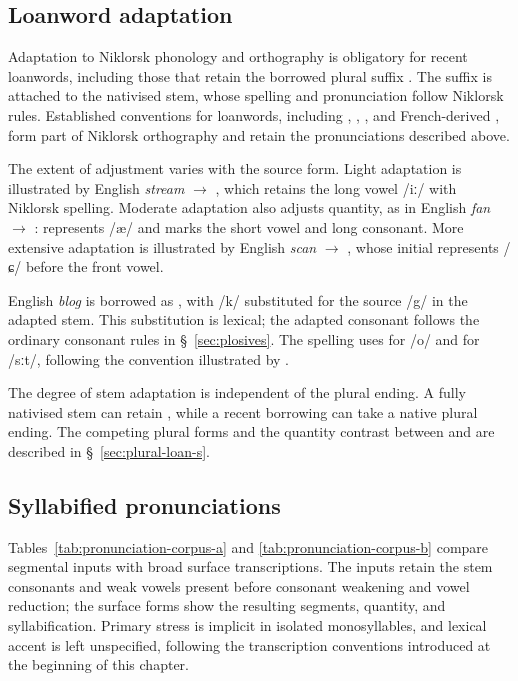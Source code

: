 \subsection{Loanword adaptation}
\label{sec:loanword-adaptation}

Adaptation to Niklorsk phonology and orthography is obligatory for recent loanwords, including those that retain the borrowed plural suffix . The suffix is attached to the nativised stem, whose spelling and pronunciation follow Niklorsk rules. Established conventions for loanwords, including , , , and French-derived , form part of Niklorsk orthography and retain the pronunciations described above.

The extent of adjustment varies with the source form. Light adaptation is illustrated by English \emph{stream} $\rightarrow$ , which retains the long vowel /iː/ with Niklorsk spelling. Moderate adaptation also adjusts quantity, as in English \emph{fan} $\rightarrow$ :  represents /æ/ and  marks the short vowel and long consonant. More extensive adaptation is illustrated by English \emph{scan} $\rightarrow$ , whose initial  represents /ɕ/ before the front vowel.

English \emph{blog} is borrowed as , with /k/ substituted for the source /g/ in the adapted stem. This substitution is lexical; the adapted consonant follows the ordinary consonant rules in \S~\ref{sec:plosives}. The spelling  uses  for /o/ and  for /sːt/, following the convention illustrated by .

The degree of stem adaptation is independent of the plural ending. A fully nativised stem can retain , while a recent borrowing can take a native plural ending. The competing plural forms and the quantity contrast between  and  are described in \S~\ref{sec:plural-loan-s}.

\subsection{Syllabified pronunciations}
\label{sec:pronunciation-corpus}

Tables~\ref{tab:pronunciation-corpus-a} and \ref{tab:pronunciation-corpus-b} compare segmental inputs with broad surface transcriptions. The inputs retain the stem consonants and weak vowels present before consonant weakening and vowel reduction; the surface forms show the resulting segments, quantity, and syllabification. Primary stress is implicit in isolated monosyllables, and lexical accent is left unspecified, following the transcription conventions introduced at the beginning of this chapter.

